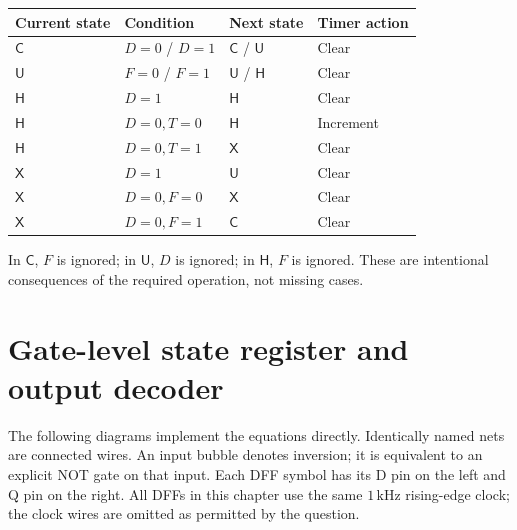 \begin{center}
\begin{tabular}{llll}
\toprule
Current state & Condition & Next state & Timer action\\
\midrule
\(\mathsf C\) & \(D=0\) / \(D=1\) & \(\mathsf C\) / \(\mathsf U\) & Clear\\
\(\mathsf U\) & \(F=0\) / \(F=1\) & \(\mathsf U\) / \(\mathsf H\) & Clear\\
\(\mathsf H\) & \(D=1\) & \(\mathsf H\) & Clear\\
\(\mathsf H\) & \(D=0,T=0\) & \(\mathsf H\) & Increment\\
\(\mathsf H\) & \(D=0,T=1\) & \(\mathsf X\) & Clear\\
\(\mathsf X\) & \(D=1\) & \(\mathsf U\) & Clear\\
\(\mathsf X\) & \(D=0,F=0\) & \(\mathsf X\) & Clear\\
\(\mathsf X\) & \(D=0,F=1\) & \(\mathsf C\) & Clear\\
\bottomrule
\end{tabular}
\end{center}
In \(\mathsf C\), \(F\) is ignored; in \(\mathsf U\), \(D\) is ignored;
in \(\mathsf H\), \(F\) is ignored. These are intentional consequences
of the required operation, not missing cases.

\clearpage
\section{Gate-level state register and output decoder}
The following diagrams implement the equations directly. Identically
named nets are connected wires. An input bubble denotes inversion; it is
equivalent to an explicit NOT gate on that input. Each DFF symbol has
its D pin on the left and Q pin on the right. All DFFs in this chapter
use the same \(1\,\mathrm{kHz}\) rising-edge clock; the clock wires are
omitted as permitted by the question.

